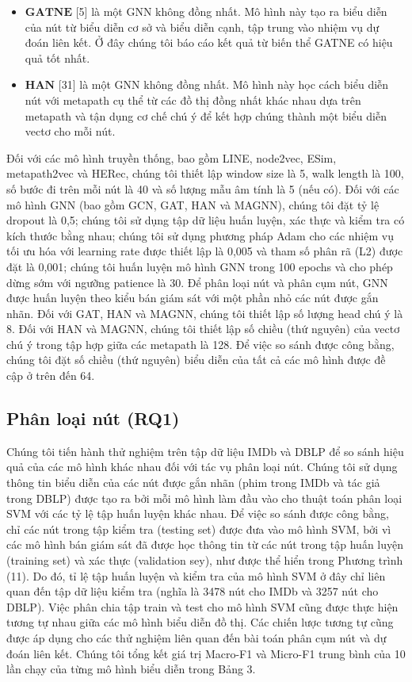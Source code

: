 \begin{itemize}
  \item $\mathbf{GATNE}$ [5] là một GNN không đồng nhất. Mô hình này tạo ra biểu diễn của nút từ biểu diễn cơ sở và biểu diễn cạnh, tập trung vào nhiệm vụ dự đoán liên kết. Ở đây chúng tôi báo cáo kết quả từ biến thể GATNE có hiệu quả tốt nhất.
  \item $\mathbf{HAN}$ [31] là một GNN không đồng nhất. Mô hình này học cách biểu diễn nút với metapath cụ thể từ các đồ thị đồng nhất khác nhau dựa trên metapath và tận dụng cơ chế chú ý để kết hợp chúng thành một biểu diễn vectơ cho mỗi nút.
\end{itemize}

Đối với các mô hình truyền thống, bao gồm LINE, node2vec, ESim, metapath2vec và HERec, chúng tôi thiết lập window size là 5, walk length là 100, số bước đi trên mỗi nút là 40 và số lượng mẫu âm tính là 5 (nếu có). Đối với các mô hình GNN (bao gồm GCN, GAT, HAN và MAGNN), chúng tôi đặt tỷ lệ dropout là 0,5; chúng tôi sử dụng tập dữ liệu huấn luyện, xác thực và kiểm tra có kích thước bằng nhau; chúng tôi sử dụng phương pháp Adam cho các nhiệm vụ tối ưu hóa với learning rate được thiết lập là 0,005 và tham số phân rã (L2) được đặt là 0,001; chúng tôi huấn luyện mô hình GNN trong 100 epochs và cho phép dừng sớm với ngưỡng patience là 30. Để phân loại nút và phân cụm nút, GNN được huấn luyện theo kiểu bán giám sát với một phần nhỏ các nút được gắn nhãn. Đối với GAT, HAN và MAGNN, chúng tôi thiết lập số lượng head chú ý là 8. Đối với HAN và MAGNN, chúng tôi thiết lập số chiều (thứ nguyên) của vectơ chú ý trong tập hợp giữa các metapath là 128. Để việc so sánh được công bằng, chúng tôi đặt số chiều (thứ nguyên) biểu diễn của tất cả các mô hình được đề cập ở trên đến 64.

\subsection{Phân loại nút (RQ1)}
Chúng tôi tiến hành thử nghiệm trên tập dữ liệu IMDb và DBLP để so sánh hiệu quả của các mô hình khác nhau đối với tác vụ phân loại nút. Chúng tôi sử dụng thông tin biểu diễn của các nút được gắn nhãn (phim trong IMDb và tác giả trong DBLP) được tạo ra bởi mỗi mô hình làm đầu vào cho thuật toán phân loại SVM với các tỷ lệ tập huấn luyện khác nhau. Để việc so sánh được công bằng, chỉ các nút trong tập kiểm tra (testing set) được đưa vào mô hình SVM, bởi vì các mô hình bán giám sát đã được học thông tin từ các nút trong tập huấn luyện (training set) và xác thực (validation sey), như được thể hiển trong Phương trình (11). Do đó, tỉ lệ tập huấn luyện và kiểm tra của mô hình SVM ở đây chỉ liên quan đến tập dữ liệu kiểm tra (nghĩa là 3478 nút cho IMDb và 3257 nút cho DBLP). Việc phân chia tập train và test cho mô hình SVM cũng được thực hiện tương tự nhau giữa các mô hình biểu diễn đồ thị. Các chiến lược tương tự cũng được áp dụng cho các thử nghiệm liên quan đến bài toán phân cụm nút và dự đoán liên kết. Chúng tôi tổng kết giá trị Macro-F1 và Micro-F1 trung bình của 10 lần chạy của từng mô hình biểu diễn trong Bảng 3.

